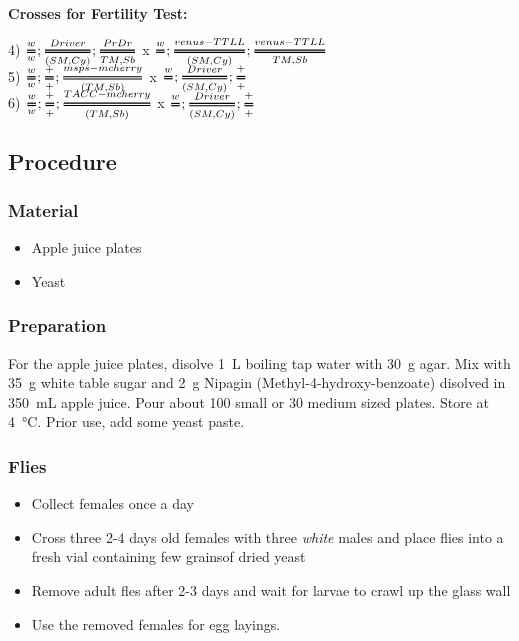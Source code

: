 \documentclass{article}
\newcommand{\Tfrac}[2]{%
	\ooalign{%
		$\genfrac{}{}{2.5pt}1{#1}{#2}$\cr%
		$\color{white}\genfrac{}{}{.8pt}1{\phantom{#1}}{\phantom{#2}}$}%
}
\begin{document}
\textbf{Crosses for Fertility Test:} \\

\begin{Large}
	4) $\Tfrac{w}{w}; \Tfrac{Driver}{(SM, Cy)}; \Tfrac{Pr Dr}{TM, Sb}$  x  $\Tfrac{w}{}; \Tfrac{venus-TTLL}{(SM, Cy)}; \Tfrac{venus-TTLL}{TM, Sb}$\\
	
	5) $\Tfrac{w}{w}; \Tfrac{+}{+}; \Tfrac{msps-mcherry}{(TM, Sb)}$  x  $\Tfrac{w}{}; \Tfrac{Driver}{(SM, Cy)}; \Tfrac{+}{+}$\\
	
	6) $\Tfrac{w}{w}; \Tfrac{+}{+}; \Tfrac{TACC-mcherry}{(TM, Sb)} $ x $\Tfrac{w}{}; \Tfrac{Driver}{(SM, Cy)}; \Tfrac{+}{+}$ 
\end{Large}


\subsection*{Procedure}
\subsubsection*{Material}
\begin{itemize}
	\item Apple juice plates
	\item Yeast
\end{itemize}

\subsubsection*{Preparation}
For the apple juice plates, disolve \SI{1}{\liter} boiling tap water with \SI{30}{\gram} agar. Mix with \SI{35}{\gram} white table sugar and \SI{2}{\gram} Nipagin (Methyl-4-hydroxy-benzoate) disolved in \SI{350}{\milli\liter} apple juice. Pour about 100 small or 30 medium sized plates. Store at \SI{4}{\degreeCelsius}. Prior use, add some yeast paste.

\subsubsection*{Flies}
\begin{itemize}
	\item Collect females once a day
	\item Cross three 2-4 days old females with three \textit{white} males and place flies into a fresh vial containing few grainsof dried yeast
	\item Remove adult fles after 2-3 days and wait for larvae to crawl up the glass wall
	\item Use the removed females for egg layings. 
\end{itemize}
\end{document}
